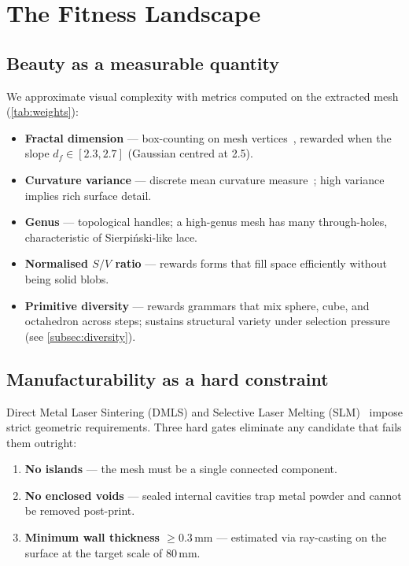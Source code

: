 \documentclass[11pt, a4paper]{article}
\begin{document}
\section{The Fitness Landscape}
\label{sec:fitness}

\subsection{Beauty as a measurable quantity}
\label{subsec:aesthetic}

We approximate visual complexity with metrics computed on the extracted mesh
(\autoref{tab:weights}):

\begin{itemize}[leftmargin=1.8em]
  \item \textbf{Fractal dimension} — box-counting on mesh vertices~\cite{mandelbrot1982fractal},
        rewarded when the slope $d_f \in [2.3, 2.7]$ (Gaussian centred at 2.5).
  \item \textbf{Curvature variance} — discrete mean curvature measure~\cite{meyer2003discrete};
        high variance implies rich surface detail.
  \item \textbf{Genus} — topological handles; a high-genus mesh has many
        through-holes, characteristic of Sierpi\'nski-like lace.
  \item \textbf{Normalised $S/V$ ratio} — rewards forms that fill space
        efficiently without being solid blobs.
  \item \textbf{Primitive diversity} — rewards grammars that mix sphere,
        cube, and octahedron across steps; sustains structural variety under
        selection pressure (see \autoref{subsec:diversity}).
\end{itemize}

\subsection{Manufacturability as a hard constraint}
\label{subsec:manufacturing}

Direct Metal Laser Sintering (DMLS) and Selective Laser Melting
(SLM)~\cite{yap2015high} impose strict geometric requirements.
Three hard gates eliminate any candidate that fails them outright:

\begin{enumerate}[leftmargin=1.8em]
  \item \textbf{No islands} — the mesh must be a single connected component.
  \item \textbf{No enclosed voids} — sealed internal cavities trap metal
        powder and cannot be removed post-print.
  \item \textbf{Minimum wall thickness $\geq 0.3\,\mathrm{mm}$} — estimated
        via ray-casting on the surface at the target scale of $80\,\mathrm{mm}$.
\end{enumerate}
\end{document}
